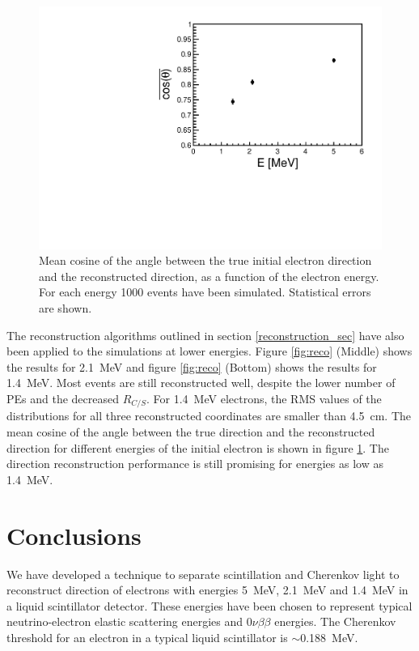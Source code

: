 \documentclass[cits]{JINST}
\begin{document}
\begin{figure}
        \begin{center}
        \includegraphics[scale=0.4]{graphs/hCos_vs_E_final.pdf}
        \caption[]{Mean cosine of the angle between the true initial electron direction and the reconstructed direction, as a function of the electron energy. For each energy 1000 events have been simulated. Statistical errors are
shown. \label{Edep_angle}}
        \end{center}
\end{figure}

The reconstruction algorithms outlined in section \ref{reconstruction_sec} have also been applied
to the simulations at lower energies. Figure \ref{fig:reco} (Middle) shows the results for 2.1~MeV and figure \ref{fig:reco} (Bottom) shows the results for 1.4~MeV. Most events are still reconstructed well, despite the lower
number of PEs and the decreased $R_{C/S}$. For 1.4~MeV electrons, the RMS values of the distributions for all three
reconstructed coordinates are smaller than 4.5~cm. The mean cosine of the angle between the true direction
and the reconstructed direction for different energies of the initial electron is shown in figure
\ref{Edep_angle}. The direction reconstruction performance is still promising for energies as low as 1.4~MeV.

\section{Conclusions}

We have developed a technique to separate scintillation and Cherenkov light to reconstruct direction of electrons with energies 5~MeV, 2.1~MeV and 1.4~MeV in a liquid scintillator detector. These energies have been chosen to represent typical neutrino-electron elastic scattering energies and
$0\nu\beta\beta$ energies. The Cherenkov threshold for an electron in a typical liquid scintillator is $\sim$0.188~MeV.
\end{document}
